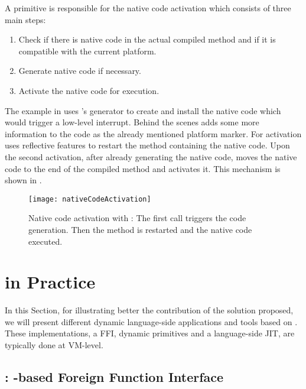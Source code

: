 A \B primitive is responsible for the native code activation which consists of three main steps:
%
\begin{enumerate}
	\item Check if there is native code in the actual compiled method and if it is compatible with the current platform.
	\item Generate native code if necessary.
	\item Activate the native code for execution.
\end{enumerate}
%
The example in  uses \B's generator to create and install the native code which would trigger a low-level interrupt. Behind the scenes \B adds some more information to the code as the already mentioned platform marker. 
For activation \B uses reflective features to restart the method containing the native code.
Upon the second activation, after already generating the native code, \B moves the native code to the end of the compiled method and activates it.
This mechanism is shown in .

\begin{figure}[ht]
	\centering
	\texttt{[image: nativeCodeActivation]}
	\caption{Native code activation with \B: The first call triggers the code generation. Then the method is restarted and the native code executed.}
\end{figure}

\section{\B in Practice}

In this Section, for illustrating better the contribution of the solution proposed, we will present different dynamic language-side applications and tools based on \B.
These implementations, a FFI, dynamic primitives and a language-side JIT, are typically done at VM-level.

\subsection{\NB: \B-based Foreign Function Interface}


